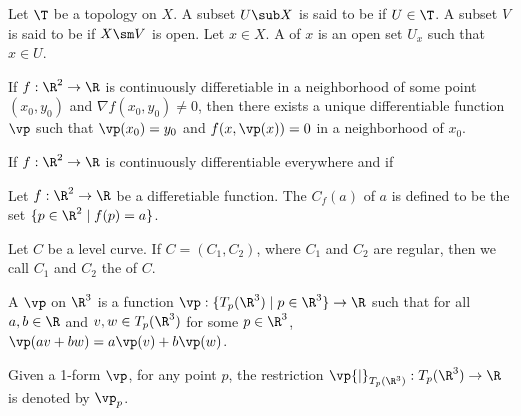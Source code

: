 \documentclass[12pt]{article}
\begin{document}
\begin{definition}
    Let $\T$ be a topology on $X$. A subset $U\sub X$ is said to be  if $U\in\T$. A subset $V$ is said to be  if $X\sm V$ is open. Let $x\in X$. A  of $x$ is an open set ${U}_{x}$ such that $x\in U$.
\end{definition}
\begin{theorem}
    If $f:{\R}^{2}\to\R$ is continuously differetiable in a neighborhood of some point $({x}_{0},{y}_{0})$ and $\nabla f({x}_{0},{y}_{0})\ne 0$, then there exists a unique differentiable function $\vp$ such that $\vp({x}_{0})={y}_{0}$ and $f(x,\vp(x))=0$ in a neighborhood of ${x}_{0}$.
\end{theorem}
\par
If $f:{\R}^{2}\to\R$ is continuously differentiable everywhere and if 

\begin{definition}
    Let $f:{\R}^{2}\to\R$ be a differetiable function. The  ${C}_{f}(a)$ of  $a$ is defined to be the set $\{p\in{\R}^{2}\mid f(p)=a\}$.
\end{definition}
\begin{definition}
    Let $C$ be a level curve. If $C=({C}_{1},{C}_{2})$, where ${C}_{1}$ and ${C}_{2}$ are regular, then we call ${C}_{1}$ and ${C}_{2}$ the  of $C$.
\end{definition}
\begin{definition}
    A  $\vp$ on ${\R}^{3}$ is a function $\vp:\{{T}_{p}({\R}^{3})\mid p\in{\R}^{3}\}\to\R$ such that for all $a,b\in\R$ and $v,w\in{T}_{p}({\R}^{3})$ for some $p\in{\R}^{3}$, $\vp(av+bw)=a\vp(v)+b\vp(w)$.
\end{definition}
\par
Given a 1-form $\vp$, for any point $p$, the restriction $\vp{\vert}_{{T}_{p}({\R}^{3})}:{T}_{p}({\R}^{3})\to\R$ is denoted by ${\vp}_{p}$.







\hindex
\end{document}

